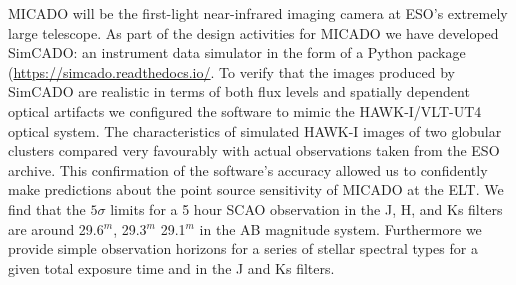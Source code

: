\abstract
{}
{MICADO will be the first-light near-infrared imaging camera at ESO's extremely large telescope. As part of the design activities for MICADO we have developed SimCADO: an instrument data simulator in the form of a Python package (\url{https://simcado.readthedocs.io/}.}
{To verify that the images produced by SimCADO are realistic in terms of both flux levels and spatially dependent optical artifacts we configured the software to mimic the HAWK-I/VLT-UT4 optical system. The characteristics of simulated HAWK-I images of two globular clusters compared very favourably with actual observations taken from the ESO archive. This confirmation of the software's accuracy allowed us to confidently make predictions about the point source sensitivity of MICADO at the ELT.}
{We find that the $5\sigma$ limits for a 5 hour SCAO observation in the J, H, and Ks filters are around 29.6$^m$, 29.3$^m$ 29.1$^m$ in the AB magnitude system. Furthermore we provide simple observation horizons for a series of stellar spectral types for a given total exposure time and in the J and Ks filters.}
{}
